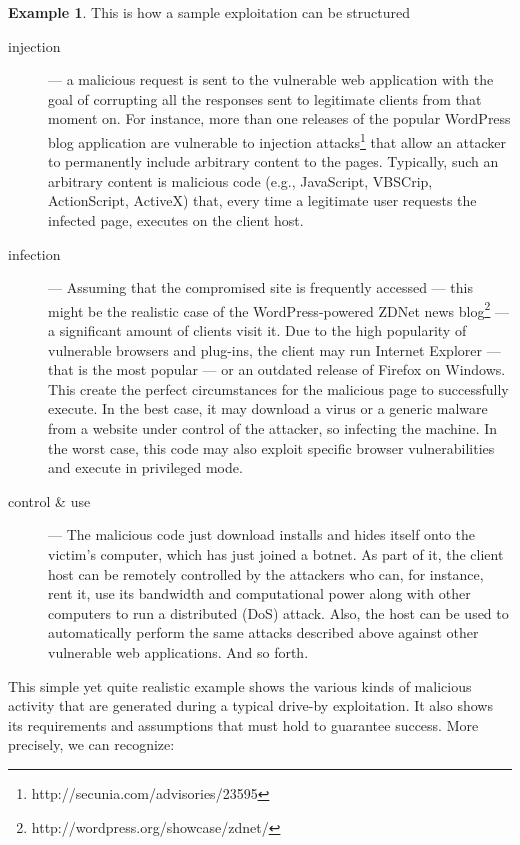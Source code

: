 \documentclass[12pt]{article}
\theoremstyle{definition}
\newtheorem{example}{Example}[section]
\begin{document}
		\begin{example}
				This is how a sample exploitation can be structured
				\begin{description}
					\item [injection] --- a malicious request is sent to the vulnerable
					web application with the goal of corrupting all the responses sent
					to legitimate clients from that moment on. For instance, more than
					one releases of the popular \textsf{WordPress} blog application are
					vulnerable to injection
					attacks\footnote{http://secunia.com/advisories/23595} that allow an
					attacker to permanently include arbitrary content to the
					pages. Typically, such an arbitrary content is malicious code (e.g.,
					JavaScript, VBSCrip, ActionScript, ActiveX) that, every time a
					legitimate user requests the infected page, executes on the client
					host.
					\item [infection] --- Assuming that the compromised site is
					frequently accessed --- this might be the realistic case of the
					\textsf{WordPress}-powered \textsf{ZDNet} news
					blog\footnote{http://wordpress.org/showcase/zdnet/} --- a
					significant amount of clients visit it. Due to the high popularity
					of vulnerable browsers and plug-ins, the client may run
					\textsf{Internet Explorer} --- that is the most popular --- or an
					outdated release of \textsf{Firefox} on \textsf{Windows}. This
					create the perfect circumstances for the malicious page to
					successfully execute. In the best case, it may download a virus or a
					generic malware from a website under control of the attacker, so
					infecting the machine. In the worst case, this code may also exploit
					specific browser vulnerabilities and execute in privileged mode.
					\item [control \& use] --- The malicious code just download installs
					and hides itself onto the victim's computer, which has just joined a
					botnet. As part of it, the client host can be remotely controlled by
					the attackers who can, for instance, rent it, use its bandwidth and
					computational power along with other computers to run a distributed
					(DoS) attack\cite{Raman2017}. Also, the host can be used to automatically perform
					the same attacks described above against other vulnerable web
					applications. And so forth.
				\end{description}
			\end{example}
		
		This simple yet quite realistic example shows the various kinds of
		malicious activity that are generated during a typical drive-by
		exploitation\cite{Saeed2016}. It also shows its requirements and assumptions that must
		hold to guarantee success. More precisely, we can recognize:
		
\end{document}
